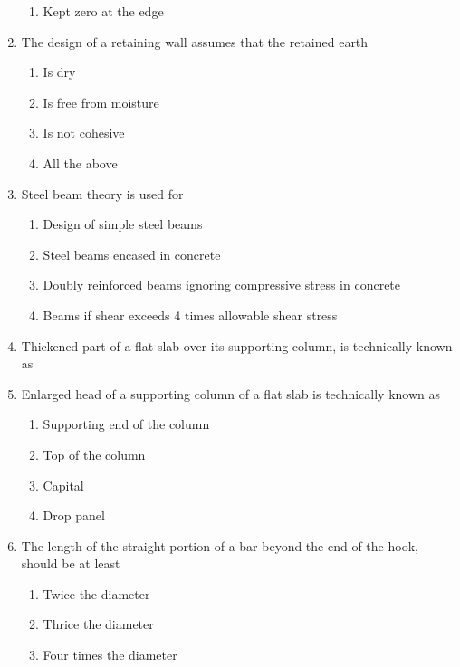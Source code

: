 \documentclass[11pt,a4paper]{article}
\begin{document}
\begin{enumerate}
\begin{enumerate}[label=\Alph*.]
\item{Kept zero at the edge}
\end{enumerate}
\item{The design of a retaining wall assumes that the retained earth}
\begin{enumerate}[label=\Alph*.]
\item{Is dry}
\item{Is free from moisture}
\item{Is not cohesive}
\item{All the above}
\end{enumerate}
\item{Steel beam theory is used for}
\begin{enumerate}[label=\Alph*.]
\item{Design of simple steel beams}
\item{Steel beams encased in concrete}
\item{Doubly reinforced beams ignoring compressive stress in concrete}
\item{Beams if shear exceeds 4 times allowable shear stress}
\end{enumerate}
\item{Thickened part of a flat slab over its supporting column, is technically known as}
\\
\item{Enlarged head of a supporting column of a flat slab is technically known as}
\begin{enumerate}[label=\Alph*.]
\item{Supporting end of the column}
\item{Top of the column}
\item{Capital}
\item{Drop panel}
\end{enumerate}
\item{The length of the straight portion of a bar beyond the end of the hook, should be at least}
\begin{enumerate}[label=\Alph*.]
\item{Twice the diameter}
\item{Thrice the diameter}
\item{Four times the diameter}

\end{enumerate}
\end{enumerate}
\end{document}
